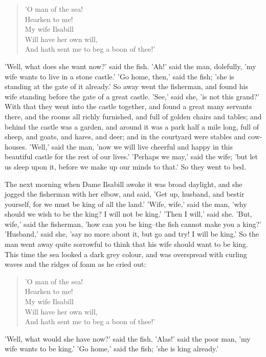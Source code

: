 \documentclass[12pt]{book}
\begin{document}
\begin{verse}
 'O man of the sea!\\
  Hearken to me!\\
  My wife Ilsabill\\
  Will have her own will,\\
  And hath sent me to beg a boon of thee!'
\end{verse}

'Well, what does she want now?' said the fish. 'Ah!' said the man,
dolefully, 'my wife wants to live in a stone castle.' 'Go home, then,'
said the fish; 'she is standing at the gate of it already.' So away
went the fisherman, and found his wife standing before the gate of a
great castle. 'See,' said she, 'is not this grand?' With that they
went into the castle together, and found a great many servants there,
and the rooms all richly furnished, and full of golden chairs and
tables; and behind the castle was a garden, and around it was a park
half a mile long, full of sheep, and goats, and hares, and deer; and
in the courtyard were stables and cow-houses. 'Well,' said the man,
'now we will live cheerful and happy in this beautiful castle for the
rest of our lives.' 'Perhaps we may,' said the wife; 'but let us sleep
upon it, before we make up our minds to that.' So they went to bed.

The next morning when Dame Ilsabill awoke it was broad daylight, and
she jogged the fisherman with her elbow, and said, 'Get up, husband,
and bestir yourself, for we must be king of all the land.' 'Wife,
wife,' said the man, 'why should we wish to be the king? I will not be
king.' 'Then I will,' said she. 'But, wife,' said the fisherman, 'how
can you be king--the fish cannot make you a king?' 'Husband,' said
she, 'say no more about it, but go and try! I will be king.' So the
man went away quite sorrowful to think that his wife should want to be
king. This time the sea looked a dark grey colour, and was overspread
with curling waves and the ridges of foam as he cried out:

\begin{verse}
 'O man of the sea!\\
  Hearken to me!\\
  My wife Ilsabill\\
  Will have her own will,\\
  And hath sent me to beg a boon of thee!'
\end{verse}

'Well, what would she have now?' said the fish. 'Alas!' said the poor
man, 'my wife wants to be king.' 'Go home,' said the fish; 'she is
king already.'
\end{document}
